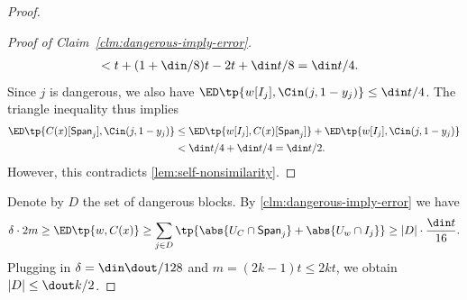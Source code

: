 \begin{proof}
\begin{proof}[Proof of Claim~\ref{clm:dangerous-imply-error}]
\begin{align*}
			&< t + (1+\din/8)t - 2t + \din t/8 = \din t/4.
		\end{align*}
		Since $j$ is dangerous, we also have $\ED\tp{w[I_j], \Cin(j, 1-y_j)}\le \din t/4$. The triangle inequality thus implies
		\begin{align*}
			\ED\tp{C(x)[{\textsf{Span}_j}], \Cin(j, 1-y_j)} &\le \ED\tp{w[{I_j}], C(x)[{\textsf{Span}_j}]} + \ED\tp{w[{I_j}], \Cin(j, 1-y_j)}\\
			&< \din t/4 + \din t/4 = \din t/2.
		\end{align*}
		However, this contradicts \cref{lem:self-nonsimilarity}.
	\end{proof}
	
	Denote by $D$ the set of dangerous blocks. By \cref{clm:dangerous-imply-error} we have
	\begin{align*}
	\delta \cdot 2m \ge \ED\tp{w, C(x)} \ge \sum_{j \in D}\tp{\abs{U_C \cap \textsf{Span}_j} + \abs{U_w \cap I_j}} \ge |D| \cdot \frac{\din t}{16}.
	\end{align*}
	Plugging in $\delta = \din\dout/128$ and $m=(2k-1)t \leq 2kt$, we obtain $|D| \le \dout k/2$.
\end{proof}

